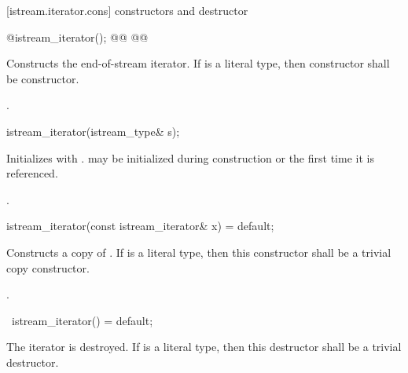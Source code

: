 [istream.iterator.cons]{ constructors and destructor}


%
\begin{itemdecl}
@\seebelow@ istream_iterator();
@\newtxt{\seebelow}@ @@
\end{itemdecl}

\begin{itemdescr}
\pnum
\effects
Constructs the end-of-stream iterator. If  is a literal type, then 
constructor shall be  constructor.

\pnum
\postcondition {}.
\end{itemdescr}

%
\begin{itemdecl}
istream_iterator(istream_type& s);
\end{itemdecl}

\begin{itemdescr}
\pnum
\effects
Initializes  with .  may be initialized during
construction or the first time it is referenced.

\pnum
\postcondition {}.
\end{itemdescr}

%
\begin{itemdecl}
istream_iterator(const istream_iterator& x) = default;
\end{itemdecl}

\begin{itemdescr}
\pnum
\effects
Constructs a copy of . If  is a literal type, then this constructor shall be a trivial copy constructor.

\pnum
\postcondition {}.
\end{itemdescr}

%
\begin{itemdecl}
~istream_iterator() = default;
\end{itemdecl}

\begin{itemdescr}
\pnum
\effects
The iterator is destroyed. If  is a literal type, then this destructor shall be a trivial destructor.
\end{itemdescr}

